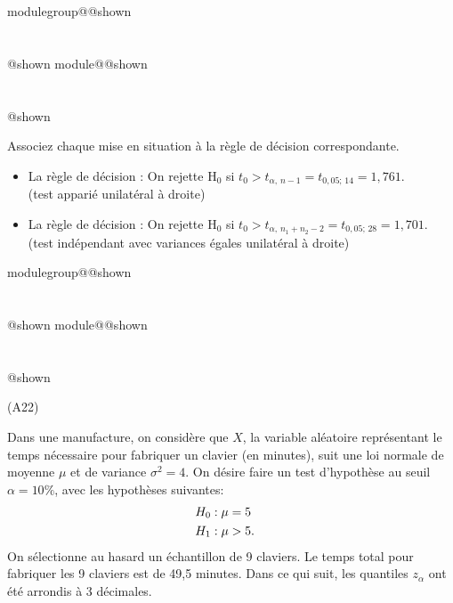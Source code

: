 \documentclass{Evaluation}
\makeatletter
\newcommand{\currentmodulekey}{}
\newcommand{\currentmoduletitle}{}
\newcommand{\currentgroupkey}{}
\newcommand{\currentgrouptitle}{}
\newcommand{\showmoduleifneeded}{%
  \ifx\currentgroupkey\empty\else
    \expandafter\ifx\csname modulegroup@\currentgroupkey @shown\endcsname\relax
      \section*{\currentgrouptitle}%
      \expandafter\gdef\csname modulegroup@\currentgroupkey @shown\endcsname{1}%
    \fi
  \fi
  \expandafter\ifx\csname module@\currentmodulekey @shown\endcsname\relax
    \section*{\currentmoduletitle}%
    \expandafter\gdef\csname module@\currentmodulekey @shown\endcsname{1}%
  \fi
}
\newenvironment{A22}{\showmoduleifneeded}{}
\makeatother
\begin{document}
\begin{questions}
\begin{A22}
\medskip

Associez chaque mise en situation à la règle de décision correspondante.

\medskip


 
\begin{solution}
	\begin{itemize}
		\item La règle de décision : On rejette $\mathrm{H}_0$ si $t_0 > t_{\alpha, \, n-1} = t_{0,05; \, 14} = 1,761$.\\
		(test apparié unilatéral à droite)
		\item La règle de décision : On rejette $\mathrm{H}_0$ si $t_0 > t_{\alpha, \, n_1+n_2-2} = t_{0,05; \, 28} = 1,701$.\\
		(test indépendant avec variances égales unilatéral à droite)
	\end{itemize}
\end{solution}

\end{A22}

\begin{A22}
\question
(A22)

Dans une manufacture, on considère que $X$, la variable aléatoire représentant le temps nécessaire pour fabriquer un clavier (en minutes), suit une loi normale de moyenne $\mu$ et de variance $\sigma^2=4$. On désire faire un test d'hypothèse au seuil $\alpha=10\%$, avec les hypothèses suivantes:
\begin{align*}
	H_0&: \mu=5\cr
	H_1&: \mu > 5.
\end{align*}
On sélectionne au hasard un échantillon de 9 claviers. Le temps total pour fabriquer les 9 claviers est de 49,5 minutes. Dans ce qui suit, les quantiles $z_\alpha$ ont été arrondis à 3 décimales.


\end{A22}
\end{questions}
\end{document}
